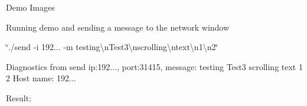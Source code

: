 \begin{DoxyParagraph}{Demo Images}

\begin{DoxyItemize}
\item Running demo and sending a message to the network window
\item \char`\"{}./send -\/i 192... -\/m \textquotesingle{}testing\textbackslash{}n\+Test3\textbackslash{}nscrolling\textbackslash{}ntext\textbackslash{}n1\textbackslash{}n2\textquotesingle{}\char`\"{}
\begin{DoxyItemize}
\item Diagnostics from send ip\+:192..., port\+:31415, message\+: testing Test3 scrolling text 1 2 Host name\+: 192...
\begin{DoxyItemize}
\item Result\+:  
\end{DoxyItemize}
\end{DoxyItemize}
\end{DoxyItemize}
\end{DoxyParagraph}
